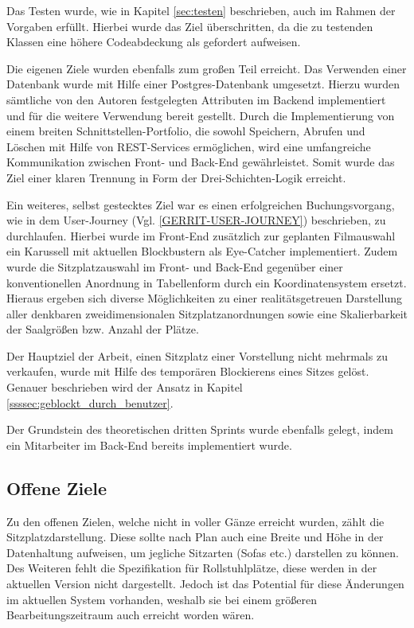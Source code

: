 Das Testen wurde, wie in Kapitel \vref{sec:testen} beschrieben, auch im Rahmen der Vorgaben erfüllt. Hierbei wurde das Ziel überschritten, da die zu testenden Klassen eine höhere Codeabdeckung als gefordert aufweisen.

Die eigenen Ziele wurden ebenfalls zum großen Teil erreicht. Das Verwenden einer Datenbank wurde mit Hilfe einer Postgres-Datenbank umgesetzt.
Hierzu wurden sämtliche von den Autoren festgelegten Attributen im Backend implementiert und für die weitere Verwendung bereit gestellt.
Durch die Implementierung von einem breiten Schnittstellen-Portfolio, die sowohl Speichern, Abrufen und Löschen mit Hilfe von \acs{REST}-Services ermöglichen, wird eine umfangreiche Kommunikation zwischen Front- und Back-End gewährleistet.
Somit wurde das Ziel einer klaren Trennung in Form der Drei-Schichten-Logik erreicht.

Ein weiteres, selbst gestecktes Ziel war es einen erfolgreichen Buchungsvorgang, wie in dem User-Journey (Vgl. \vref{GERRIT-USER-JOURNEY}) beschrieben, zu durchlaufen. 
Hierbei wurde im Front-End zusätzlich zur geplanten Filmauswahl ein Karussell mit aktuellen Blockbustern als Eye-Catcher implementiert.
Zudem wurde die Sitzplatzauswahl im Front- und Back-End gegenüber einer konventionellen Anordnung in Tabellenform durch ein Koordinatensystem ersetzt.
Hieraus ergeben sich diverse Möglichkeiten zu einer realitätsgetreuen Darstellung aller denkbaren zweidimensionalen Sitzplatzanordnungen sowie eine Skalierbarkeit der Saalgrößen bzw. Anzahl der Plätze.

Der Hauptziel der Arbeit, einen Sitzplatz einer Vorstellung nicht mehrmals zu verkaufen, wurde mit Hilfe des temporären Blockierens eines Sitzes gelöst. 
Genauer beschrieben wird der Ansatz in Kapitel \vref{ssssec:geblockt_durch_benutzer}.

Der Grundstein des theoretischen dritten Sprints wurde ebenfalls gelegt, indem ein Mitarbeiter im Back-End bereits implementiert wurde.


\subsection{Offene Ziele}

Zu den offenen Zielen, welche nicht in voller Gänze erreicht wurden, zählt die Sitzplatzdarstellung.
Diese sollte nach Plan auch eine Breite und Höhe in der Datenhaltung aufweisen, um jegliche Sitzarten (Sofas etc.) darstellen zu können.
Des Weiteren fehlt die Spezifikation für Rollstuhlplätze, diese werden in der aktuellen Version nicht dargestellt.
Jedoch ist das Potential für diese Änderungen im aktuellen System vorhanden, weshalb sie bei einem größeren Bearbeitungszeitraum auch erreicht worden wären.

